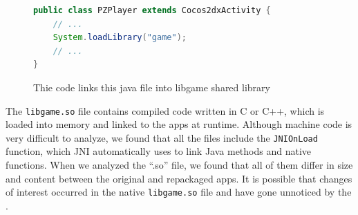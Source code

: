 \begin{figure}[ht]
\centering
{}
\begin{lstlisting}[language=Java]
public class PZPlayer extends Cocos2dxActivity {
    // ...
    System.loadLibrary("game");
    // ...
}
\end{lstlisting}
\caption{Thie code links this java file into libgame shared library}
\label{code:jni}
\end{figure}


The \texttt{libgame.so} file contains compiled code written in C or C++, which is loaded into memory and linked to the apps at runtime. Although machine code is very difficult to analyze, we found that all the files include the \texttt{JNI\underline{\hspace{.1in}}OnLoad} function, which JNI automatically uses to link Java methods and native functions. When we analyzed the ``.so'' file, we found that all of them differ in size and content between the original and repackaged apps. It is possible that changes of interest occurred in the native \texttt{libgame.so} file and have gone unnoticed by the \mas.





 








